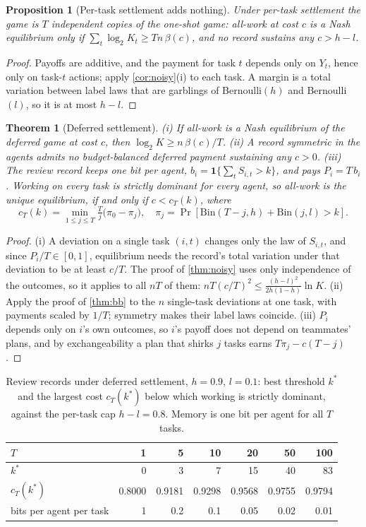 \documentclass[sigconf,anonymous,acmthm=false]{aamas}
\theoremstyle{acmplain}
\newtheorem{theorem}{Theorem}
\newtheorem{proposition}{Proposition}
\theoremstyle{acmdefinition}
\begin{document}
\begin{proposition}[Per-task settlement adds nothing]\label{prop:pertask}
Under per-task settlement the game is $T$ independent copies of the one-shot game: all-work at
cost $c$ is a Nash equilibrium only if $\sum_t\log_2K_t\ge Tn\,\beta(c)$, and no record
sustains any $c>h-l$.
\end{proposition}
\begin{proof}
Payoffs are additive, and the payment for task $t$ depends only on $Y_t$, hence only on
task-$t$ actions; apply \cref{cor:noisy}(i) to each task. A margin is a total variation
between label laws that are garblings of Bernoulli$(h)$ and Bernoulli$(l)$, so it is at most
$h-l$.
\end{proof}

\begin{theorem}[Deferred settlement]\label{thm:deferred}
(i) If all-work is a Nash equilibrium of the deferred game at cost $c$, then
$\log_2K\ge n\,\beta(c)/T$. (ii) A record symmetric in the agents admits no budget-balanced
deferred payment sustaining any $c>0$. (iii) The \emph{review record} keeps one bit per agent,
$b_i=\mathbf1\{\sum_tS_{i,t}>k\}$, and pays $P_i=T\,b_i$. Working on every task is strictly
dominant for every agent, so all-work is the unique equilibrium, if and only if $c<c_T(k)$,
where
\[ c_T(k)=\min_{1\le j\le T}\tfrac Tj\big(\pi_0-\pi_j\big),\quad
\pi_j=\Pr[\mathrm{Bin}(T{-}j,h)+\mathrm{Bin}(j,l)>k]. \]
\end{theorem}
\begin{proof}
(i) A deviation on a single task $(i,t)$ changes only the law of $S_{i,t}$, and since
$P_i/T\in[0,1]$, equilibrium needs the record's total variation under that deviation to be at
least $c/T$. The proof of \cref{thm:noisy} uses only independence of the outcomes, so it
applies to all $nT$ of them: $nT(c/T)^2\le\frac{(h-l)^2}{2h(1-h)}\ln K$. (ii) Apply the proof
of \cref{thm:bb} to the $n$ single-task deviations at one task, with payments scaled by
$1/T$; symmetry makes their label laws coincide. (iii) $P_i$ depends only on $i$'s own
outcomes, so $i$'s payoff does not depend on teammates' plans, and by exchangeability a plan
that shirks $j$ tasks earns $T\pi_j-c(T-j)$.
\end{proof}

\begin{table}[t]
\caption{Review records under deferred settlement, $h=0.9$, $l=0.1$: best threshold $k^*$ and
the largest cost $c_T(k^*)$ below which working is strictly dominant, against the per-task cap
$h-l=0.8$. Memory is one bit per agent for all $T$ tasks.}
\label{tab:review}
\footnotesize
\begin{tabular}{@{}lrrrrrr@{}}
\toprule
$T$ & 1 & 5 & 10 & 20 & 50 & 100\\
\midrule
$k^*$ & 0 & 3 & 7 & 15 & 40 & 83\\
$c_T(k^*)$ & 0.8000 & 0.9181 & 0.9298 & 0.9568 & 0.9755 & 0.9794\\
bits per agent per task & 1 & 0.2 & 0.1 & 0.05 & 0.02 & 0.01\\
\bottomrule
\end{tabular}
\end{table}
\end{document}
